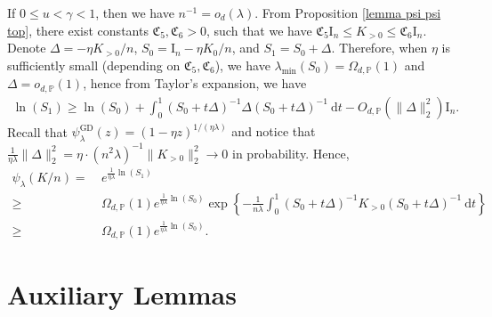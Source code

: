 \documentclass{article}
\theoremstyle{plain}
\theoremstyle{definition}
\theoremstyle{remark}
\newcommand{\rem}{\psi_\lambda}
\newcommand{\mr}{\mathrm}
\newcommand{\green}{\color{green}}
\newcommand{\dhnote}[1]{{\color{red}[#1]} } %
\begin{document}
\begin{appendix}
If $0 \leq u < \gamma <1$, then we have $n^{-1}=o_d(\lambda)$. From Proposition \ref{lemma psi psi top}, there exist constants $\mathfrak{C}_5, \mathfrak{C}_6 >0$, such that we have $\mathfrak{C}_5 \mathrm{I}_n \leq K_{>0} \leq \mathfrak{C}_6 \mathrm{I}_n$. Denote $\Delta = -\eta K_{> 0}/n$, $S_0=\mathrm{I}_n-\eta K_{0}/n$, and $S_1=S_0+\Delta$. Therefore, when $\eta$ is sufficiently small (depending on $\mathfrak{C}_5, \mathfrak{C}_6$), we have $\lambda_{\min}(S_0)=\Omega_{d, \mathbb{P}}(1)$ and $\Delta=o_{d, \mathbb{P}}(1)$, hence from Taylor's expansion, we have
\begin{equation*}
    \begin{aligned}
        \ln(S_1) \geq \ln(S_0) + \int_{0}^{1} (S_0 + t\Delta)^{-1} \Delta (S_0 + t\Delta)^{-1} ~\mathrm{d}t - O_{d, \mathbb{P}}(\|\Delta\|_{2}^{2})\mathrm{I}_n.
    \end{aligned}
\end{equation*}
Recall that $\rem^{\mr{GD}}(z) = (1-\eta z)^{1/(\eta \lambda)}$ {\green and notice that $\frac{1}{\eta \lambda}\|\Delta\|_2^2 =  \eta \cdot (n^2\lambda)^{-1} \|K_{>0}\|_2^2 \to 0$ in probability.} Hence,
\begin{equation*}
    \begin{aligned}
        \rem(K/n) = &~ e^{\frac{1}{\eta \lambda}\ln(S_1)}\\
        \geq &~ 
        \Omega_{d, \mathbb{P}}(1) 
        e^{\frac{1}{\eta \lambda}\ln(S_0)}
        \exp\left\{-\frac{1}{n\lambda}
        \int_{0}^{1} (S_0 + t\Delta)^{-1} K_{>0} (S_0 + t\Delta)^{-1} ~\mathrm{d}t
        \right\}\\
        \geq &~
        \Omega_{d, \mathbb{P}}(1) 
        e^{\frac{1}{\eta \lambda}\ln(S_0)}.
    \end{aligned}
\end{equation*}
\fi











\section{Auxiliary Lemmas}\label{appendix_auxiliary}



\end{appendix}
\end{document}
